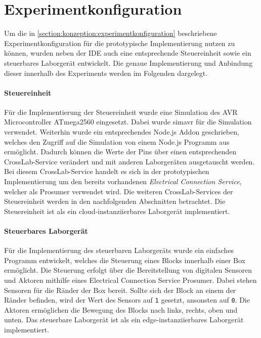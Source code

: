\section{Experimentkonfiguration}\label{section:prototypische-implementierung:experimentkonfiguration}


Um die in \autoref{section:konzeption:experimentkonfiguration} beschriebene Experimentkonfiguration für die prototypische Implementierung nutzen zu können, wurden neben der IDE auch eine entsprechende Steuereinheit sowie ein steuerbares Laborgerät entwickelt. Die genaue Implementierung und Anbindung dieser innerhalb des Experiments werden im Folgenden dargelegt.

\paragraph{Steuereinheit}
Für die Implementierung der Steuereinheit wurde eine Simulation des AVR Microcontroller ATmega2560 \cite{noauthor_atmega2560_nodate} eingesetzt. Dabei wurde simavr \cite{pollet_simavr_2025} für die Simulation verwendet. Weiterhin wurde ein entsprechendes Node.js Addon geschrieben, welches den Zugriff auf die Simulation von einem Node.js Programm aus ermöglicht. Dadurch können die Werte der Pins über einen entsprechenden CrossLab-Service verändert und mit anderen Laborgeräten ausgetauscht werden. Bei diesem CrossLab-Service handelt es sich in der prototypischen Implementierung um den bereits vorhandenen \textit{Electrical Connection Service}, welcher als Prosumer verwendet wird. Die weiteren CrossLab-Services der Steuereinheit werden in den nachfolgenden Abschnitten betrachtet. Die Steuereinheit ist als ein cloud-instanziierbares Laborgerät implementiert.

\paragraph{Steuerbares Laborgerät}
Für die Implementierung des steuerbaren Laborgeräts wurde ein einfaches Programm entwickelt, welches die Steuerung eines Blocks innerhalb einer Box ermöglicht. Die Steuerung erfolgt über die Bereitstellung von digitalen Sensoren und Aktoren mithilfe eines Electrical Connection Service Prosumer. Dabei stehen Sensoren für die Ränder der Box bereit. Sollte sich der Block an einem der Ränder befinden, wird der Wert des Sensors auf \texttt{1} gesetzt, ansonsten auf \texttt{0}. Die Aktoren ermöglichen die Bewegung des Blocks nach links, rechts, oben und unten. Das steuerbare Laborgerät ist als ein edge-instanziierbares Laborgerät implementiert.

